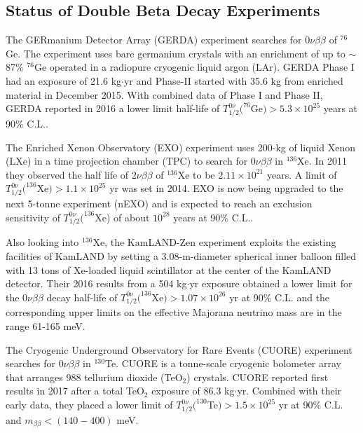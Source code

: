 \documentclass[preprint,12pt]{elsarticle}
\numberwithin{equation}{section}
\begin{document}
\subsection{Status of Double Beta Decay Experiments}
The GERmanium Detector Array (GERDA) experiment searches for $0\nu\beta\beta$ of $^{76}$Ge. The experiment uses bare germanium crystals with an enrichment of up to $\sim$87\% $^{76}$Ge operated in a radiopure cryogenic liquid argon (LAr). GERDA Phase I had an exposure of 21.6 kg$\cdot$yr and Phase-II started with 35.6 kg from enriched material in December 2015. With combined data of Phase I and Phase II, GERDA reported in 2016 a lower limit half-life of $T^{0\nu}_{1/2}(^{76}$Ge$)>5.3\times 10^{25}$ years at 90\% C.L.\cite{gerda,gerda2}.

The Enriched Xenon Observatory (EXO) experiment uses 200-kg of liquid Xenon (LXe) in a time projection chamber (TPC) to search for $0\nu\beta\beta$ in $^{136}$Xe. In 2011 they observed the half life of $2\nu\beta\beta$ of $^{136}$Xe to be $2.11\times 10^{21}$ years. A limit of $T^{0\nu}_{1/2}(^{136}$Xe$)>1.1\times 10^{25}$ yr\cite{exo} was set in 2014. EXO is now being upgraded to the next 5-tonne experiment (nEXO) and is expected to reach an exclusion sensitivity of $T^{0\nu}_{1/2}(^{136}$Xe) of about $10^{28}$ years at 90\% C.L.\cite{nEXO}.

Also looking into $^{136}$Xe, the KamLAND-Zen experiment exploits the existing facilities of KamLAND by setting a 3.08-m-diameter spherical inner balloon filled with 13 tons of Xe-loaded liquid scintillator at the center of the KamLAND detector. Their 2016 results from a 504 kg$\cdot$yr exposure obtained a lower limit for the $0\nu\beta\beta$ decay half-life of $T^{0\nu}_{1/2}(^{136}$Xe$)>1.07\times 10^{26}$ yr at 90\% C.L. and the corresponding upper limits on the effective Majorana neutrino mass are in the range 61-165 meV\cite{kamlandZen}.

The Cryogenic Underground Observatory for Rare Events (CUORE) experiment searches for $0\nu\beta\beta$ in $^{130}$Te. CUORE is a tonne-scale cryogenic bolometer array that arranges 988 tellurium dioxide (TeO$_2$) crystals. CUORE reported first results in 2017 after a total TeO$_2$ exposure of 86.3 kg$\cdot$yr. Combined with their early data, they placed a lower limit of $T^{0\nu}_{1/2}(^{130}$Te$)>1.5\times 10^{25}$ yr at 90\% C.L. and $m_{\beta\beta}<(140-400)$  meV\cite{cuore}.
\end{document}
